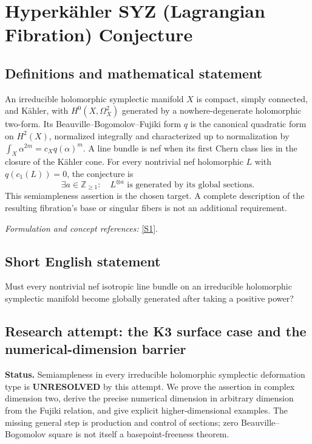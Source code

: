\documentclass[11pt]{article}
\begin{document}
\section*{\texorpdfstring{Hyperkähler SYZ (Lagrangian Fibration) Conjecture}{Hyperkähler SYZ (Lagrangian Fibration) Conjecture}}\label{statement}
\subsection{Definitions and mathematical statement}
An irreducible holomorphic symplectic manifold $X$ is compact, simply connected, and K\"ahler, with $H^0(X,\Omega_X^2)$ generated by a nowhere-degenerate holomorphic two-form. Its Beauville--Bogomolov--Fujiki form $q$ is the canonical quadratic form on $H^2(X)$, normalized integrally and characterized up to normalization by $\int_X\alpha^{2m}=c_Xq(\alpha)^m$. A line bundle is nef when its first Chern class lies in the closure of the K\"ahler cone. For every nontrivial nef holomorphic $L$ with $q(c_1(L))=0$, the conjecture is
\[
 \exists a\in{\mathbb{Z}}_{\ge1}:\quad L^{\otimes a}
 \text{ is generated by its global sections}.
\]
This semiampleness assertion is the chosen target. A complete description of the resulting fibration's base or singular fibers is not an additional requirement.
\par\smallskip\textit{Formulation and concept references:} \href{https://epiga.episciences.org/17061/pdf}{[S1]}.

\subsection{Short English statement}
Must every nontrivial nef isotropic line bundle on an irreducible holomorphic symplectic manifold become globally generated after taking a positive power?
\subsection{Research attempt: the K3 surface case and the numerical-dimension barrier}
\textbf{Status.} Semiampleness in every irreducible holomorphic symplectic deformation type is \textbf{UNRESOLVED} by this attempt. We prove the assertion in complex dimension two, derive the precise numerical dimension in arbitrary dimension from the Fujiki relation, and give explicit higher-dimensional examples. The missing general step is production and control of sections; zero Beauville--Bogomolov square is not itself a basepoint-freeness theorem.
\end{document}
